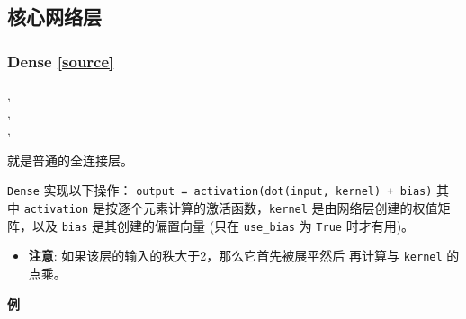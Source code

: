\subsection{核心网络层}
\subsubsection{Dense {\href{https://github.com/keras-team/keras/blob/master/keras/layers/core.py\#L743}{{[}source{]}}}}

\begin{Shaded}
\begin{Highlighting}[]
\OperatorTok{=}\OperatorTok{=}, \\
\hspace{3.5cm}\OperatorTok{=}\OperatorTok{=}, \\
\hspace{3.5cm}\OperatorTok{=}\OperatorTok{=}, \\
\hspace{3.5cm}\OperatorTok{=}\OperatorTok{=}\OperatorTok{=}\NormalTok{)}
\end{Highlighting}
\end{Shaded}

就是普通的全连接层。

\texttt{Dense} 实现以下操作：
\texttt{output\ =\ activation(dot(input,\ kernel)\ +\ bias)} 其中
\texttt{activation} 是按逐个元素计算的激活函数，\texttt{kernel}
是由网络层创建的权值矩阵，以及 \texttt{bias} 是其创建的偏置向量 (只在
\texttt{use\_bias} 为 \texttt{True} 时才有用)。

\begin{itemize}
\tightlist
\item
  \textbf{注意}: 如果该层的输入的秩大于2，那么它首先被展平然后 再计算与
  \texttt{kernel} 的点乘。
\end{itemize}

\textbf{例}

\begin{Shaded}
\begin{Highlighting}[]
\OperatorTok{=} 
\OperatorTok{=}\NormalTok{(}\NormalTok{,)))}

\NormalTok{))}
\end{Highlighting}
\end{Shaded}

